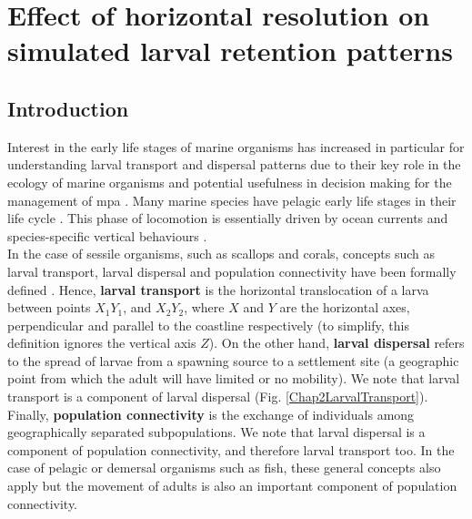 \chapter{Effect of horizontal resolution on simulated larval retention patterns}\label{Chap2}

\section{Introduction}\label{Chap2Intro}

Interest in the early life stages of marine organisms has increased \citep{Stra1993,Haven1995,Levi2006,GawaMoni2007,CoweSpon2009} in particular for understanding larval transport and dispersal patterns \citep{Youn1995,GreeMayp2015,Leis2021} due to their key role in the ecology of marine organisms \citep{MoseSmit1993} and potential usefulness in decision making for the management of \acrfull{mpa} \citep{DaloBogd2015}. Many marine species have pelagic early life stages in their life cycle \citep{Haven1995}. This phase of locomotion is essentially driven by ocean currents and species-specific vertical behaviours \citep{Levi1990,CowePari2006,DaloBogd2015}.\\

In the case of sessile organisms, such as scallops and corals, concepts such as larval transport, larval dispersal and population connectivity have been formally defined \citep{PineHare2007}. Hence, \textbf{larval transport} is the horizontal translocation of a larva between points $X_{1}Y_{1}$, and $X_{2}Y_{2}$, where $X$ and $Y$ are the horizontal axes, perpendicular and parallel to the coastline respectively (to simplify, this definition ignores the vertical axis $Z$). On the other hand, \textbf{larval dispersal} refers to the spread of larvae from a spawning source to a settlement site (a geographic point from which the adult will have limited or no mobility). We note that larval transport is a component of larval dispersal (Fig. \ref{Chap2LarvalTransport}). Finally, \textbf{population connectivity} is the exchange of individuals among geographically separated subpopulations. We note that larval dispersal is a component of population connectivity, and therefore larval transport too. In the case of pelagic or demersal organisms such as fish, these general concepts also apply but the movement of adults is also an important component of population connectivity.\\

